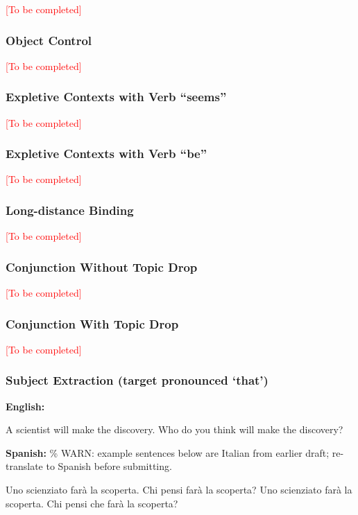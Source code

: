 \documentclass[12pt]{article}
\begin{document}
\textcolor{red}{[To be completed]}

\subsubsection{Object Control}

\textcolor{red}{[To be completed]}

\subsubsection{Expletive Contexts with Verb ``seems''}

\textcolor{red}{[To be completed]}

\subsubsection{Expletive Contexts with Verb ``be''}

\textcolor{red}{[To be completed]}

\subsubsection{Long-distance Binding}

\textcolor{red}{[To be completed]}

\subsubsection{Conjunction Without Topic Drop}

\textcolor{red}{[To be completed]}

\subsubsection{Conjunction With Topic Drop}

\textcolor{red}{[To be completed]}

\subsubsection{Subject Extraction (target pronounced `that')}

\begin{exe}
    \ex \textbf{English:}
    \begin{xlist}
        \ex A scientist will make the discovery. Who do you think will make the discovery?
    \end{xlist}
    \ex \textbf{Spanish:} \% WARN: example sentences below are Italian from earlier draft; re-translate to Spanish before submitting.
    \begin{xlist}
        \ex Uno scienziato far\`a la scoperta. Chi pensi far\`a la scoperta?
        \ex Uno scienziato far\`a la scoperta. Chi pensi che far\`a la scoperta?
    \end{xlist}
\end{exe}
\end{document}

